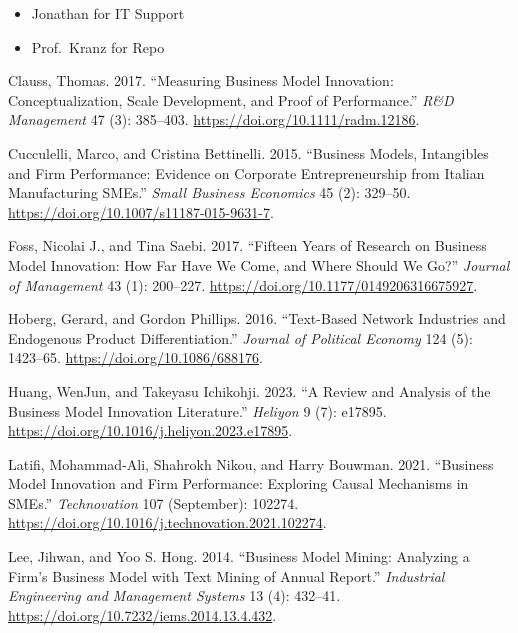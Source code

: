 \documentclass[
]{article}
\providecommand{\tightlist}{%
  \setlength{\itemsep}{0pt}\setlength{\parskip}{0pt}}\usepackage{longtable,booktabs,array}
\newlength{\cslhangindent}
\newenvironment{CSLReferences}[2] %
 {\begin{list}{}{%
  \setlength{\itemindent}{0pt}
  \setlength{\leftmargin}{0pt}
  \setlength{\parsep}{0pt}
  \ifodd #1
   \setlength{\leftmargin}{\cslhangindent}
   \setlength{\itemindent}{-1\cslhangindent}
  \fi
  \setlength{\itemsep}{#2\baselineskip}}}
 {\end{list}}
\begin{document}
\begin{itemize}
\tightlist
\item
  Jonathan for IT Support
\item
  Prof.~Kranz for Repo
\end{itemize}

\label{refs}
\begin{CSLReferences}{1}{0}
Clauss, Thomas. 2017. {``Measuring Business Model Innovation:
Conceptualization, Scale Development, and Proof of Performance.''}
\emph{R\&D Management} 47 (3): 385--403.
\url{https://doi.org/10.1111/radm.12186}.

Cucculelli, Marco, and Cristina Bettinelli. 2015. {``Business Models,
Intangibles and Firm Performance: Evidence on Corporate Entrepreneurship
from {Italian} Manufacturing {SMEs}.''} \emph{Small Business Economics}
45 (2): 329--50. \url{https://doi.org/10.1007/s11187-015-9631-7}.

Foss, Nicolai J., and Tina Saebi. 2017. {``Fifteen {Years} of {Research}
on {Business} {Model} {Innovation}: {How} {Far} {Have} {We} {Come}, and
{Where} {Should} {We} {Go}?''} \emph{Journal of Management} 43 (1):
200--227. \url{https://doi.org/10.1177/0149206316675927}.

Hoberg, Gerard, and Gordon Phillips. 2016. {``Text-{Based} {Network}
{Industries} and {Endogenous} {Product} {Differentiation}.''}
\emph{Journal of Political Economy} 124 (5): 1423--65.
\url{https://doi.org/10.1086/688176}.

Huang, WenJun, and Takeyasu Ichikohji. 2023. {``A Review and Analysis of
the Business Model Innovation Literature.''} \emph{Heliyon} 9 (7):
e17895. \url{https://doi.org/10.1016/j.heliyon.2023.e17895}.

Latifi, Mohammad-Ali, Shahrokh Nikou, and Harry Bouwman. 2021.
{``Business Model Innovation and Firm Performance: {Exploring} Causal
Mechanisms in {SMEs}.''} \emph{Technovation} 107 (September): 102274.
\url{https://doi.org/10.1016/j.technovation.2021.102274}.

Lee, Jihwan, and Yoo S. Hong. 2014. {``Business {Model} {Mining}:
{Analyzing} a {Firm}'s {Business} {Model} with {Text} {Mining} of
{Annual} {Report}.''} \emph{Industrial Engineering and Management
Systems} 13 (4): 432--41.
\url{https://doi.org/10.7232/iems.2014.13.4.432}.


\end{CSLReferences}
\end{document}
